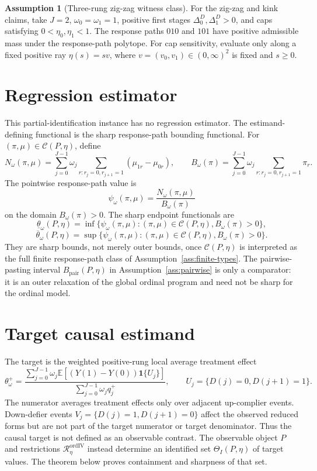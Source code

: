 \documentclass[11pt]{article}
\newcommand{\E}{\mathbb{E}}
\newcommand{\one}{\mathbf{1}}
\theoremstyle{definition}
\newtheorem{assumption}{Assumption}
\theoremstyle{plain}
\theoremstyle{remark}
\begin{document}
\begin{assumption}[Three-rung zig-zag witness class]\label{ass:zigzag-class}
For the zig-zag and kink claims, take \(J=2\), \(\omega_0=\omega_1=1\),
positive first stages \(\Delta^D_0,\Delta^D_1>0\), and caps satisfying
\(0<\eta_0,\eta_1<1\).  The response paths \(010\) and \(101\) have positive
admissible mass under the response-path polytope.  For cap sensitivity,
evaluate only along a fixed positive ray \(\eta(s)=s v\), where
\(v=(v_0,v_1)\in(0,\infty)^2\) is fixed and \(s\ge0\).
\end{assumption}

\section{Regression estimator}
This partial-identification instance has no regression estimator.  The
estimand-defining functional is the sharp response-path bounding functional.
For \((\pi,\mu)\in\mathcal C(P,\eta)\), define
\[
N_\omega(\pi,\mu)
=\sum_{j=0}^{J-1}\omega_j
  \sum_{r:r_j=0,r_{j+1}=1}(\mu_{1r}-\mu_{0r}),
\qquad
B_\omega(\pi)
=\sum_{j=0}^{J-1}\omega_j
  \sum_{r:r_j=0,r_{j+1}=1}\pi_r.
\]
The pointwise response-path value is
\[
\psi_\omega(\pi,\mu)=\frac{N_\omega(\pi,\mu)}{B_\omega(\pi)}
\]
on the domain \(B_\omega(\pi)>0\).  The sharp endpoint functionals are
\[
\underline\theta_\omega(P,\eta)
=\inf\{\psi_\omega(\pi,\mu):(\pi,\mu)\in\mathcal C(P,\eta),
B_\omega(\pi)>0\},
\]
\[
\overline\theta_\omega(P,\eta)
=\sup\{\psi_\omega(\pi,\mu):(\pi,\mu)\in\mathcal C(P,\eta),
B_\omega(\pi)>0\}.
\]
They are sharp bounds, not merely outer bounds, once
\(\mathcal C(P,\eta)\) is interpreted as the full finite response-path class
of Assumption~\ref{ass:finite-types}.  The pairwise-pasting interval
\(B_{\mathrm{pair}}(P,\eta)\) in Assumption~\ref{ass:pairwise} is only a
comparator: it is an outer relaxation of the global ordinal program and need
not be sharp for the ordinal model.

\section{Target causal estimand}
The target is the weighted positive-rung local average treatment effect
\[
\theta^+_\omega
=
\frac{\sum_{j=0}^{J-1}\omega_j
\E[(Y(1)-Y(0))\one\{U_j\}]}
{\sum_{j=0}^{J-1}\omega_j q_j^+},
\qquad
U_j=\{D(j)=0,D(j+1)=1\}.
\]
The numerator averages treatment effects only over adjacent up-complier
events.  Down-defier events \(V_j=\{D(j)=1,D(j+1)=0\}\) affect the observed
reduced forms but are not part of the target numerator or target denominator.
Thus the causal target is not defined as an observable contrast.  The
observable object \(P\) and restrictions \(\mathcal R_\eta^{\mathrm{ordIV}}\)
instead determine an identified set \(\Theta_I(P,\eta)\) of target values.
The theorem below proves containment and sharpness of that set.
\end{document}
